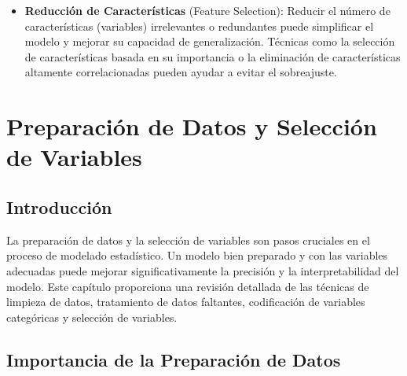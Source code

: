 \documentclass[a4paper]{report} %
\begin{document}
\begin{itemize}
\item \textbf{Reducción de Características} (Feature Selection): Reducir el número de características (variables) irrelevantes o redundantes puede simplificar el modelo y mejorar su capacidad de generalización. Técnicas como la selección de características basada en su importancia o la eliminación de características altamente correlacionadas pueden ayudar a evitar el sobreajuste.
\end{itemize}

\chapter{Preparaci\'on de Datos y Selecci\'on de Variables}

\section{Introducci\'on}

La preparaci\'on de datos y la selecci\'on de variables son pasos cruciales en el proceso de modelado estad\'istico. Un modelo bien preparado y con las variables adecuadas puede mejorar significativamente la precisi\'on y la interpretabilidad del modelo. Este cap\'itulo proporciona una revisi\'on detallada de las t\'ecnicas de limpieza de datos, tratamiento de datos faltantes, codificaci\'on de variables categ\'oricas y selecci\'on de variables.
\section{Importancia de la Preparaci\'on de Datos}
\end{document}
